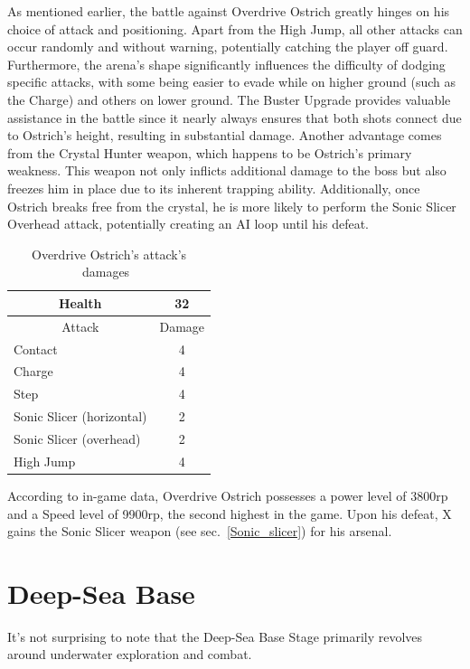 As mentioned earlier, the battle against Overdrive Ostrich greatly hinges on his choice of attack and positioning. Apart from the High Jump, all other attacks can occur randomly and without warning, potentially catching the player off guard. Furthermore, the arena's shape significantly influences the difficulty of dodging specific attacks, with some being easier to evade while on higher ground (such as the Charge) and others on lower ground. The Buster Upgrade provides valuable assistance in the battle since it nearly always ensures that both shots connect due to Ostrich's height, resulting in substantial damage. Another advantage comes from the Crystal Hunter weapon, which happens to be Ostrich's primary weakness. This weapon not only inflicts additional damage to the boss but also freezes him in place due to its inherent trapping ability. Additionally, once Ostrich breaks free from the crystal, he is more likely to perform the Sonic Slicer Overhead attack, potentially creating an AI loop until his defeat.

\begin{table}[htp]
	\centering
	\begin{tabular}[h]{l c}
		\toprule
		\multicolumn{1}{c}{Health}  & 32 \\
		\midrule
		\multicolumn{1}{c}{Attack} & \multicolumn{1}{c}{Damage}\\
		Contact & 4 \\
		Charge & 4\\
		Step& 4\\
		Sonic Slicer (horizontal) & 2\\
		Sonic Slicer (overhead) & 2\\
		High Jump & 4\\
		\bottomrule
	\end{tabular}
	\caption{Overdrive Ostrich's attack's damages~\cite{wiki:Overdrive_Ostrich}}
\end{table}
According to in-game data, Overdrive Ostrich possesses a power level of 3800rp and a Speed level of 9900rp, the second highest in the game. Upon his defeat, X gains the Sonic Slicer weapon (see sec.~\ref{Sonic_slicer}) for his arsenal.

\section{Deep-Sea Base}
It's not surprising to note that the Deep-Sea Base Stage primarily revolves around underwater exploration and combat.

